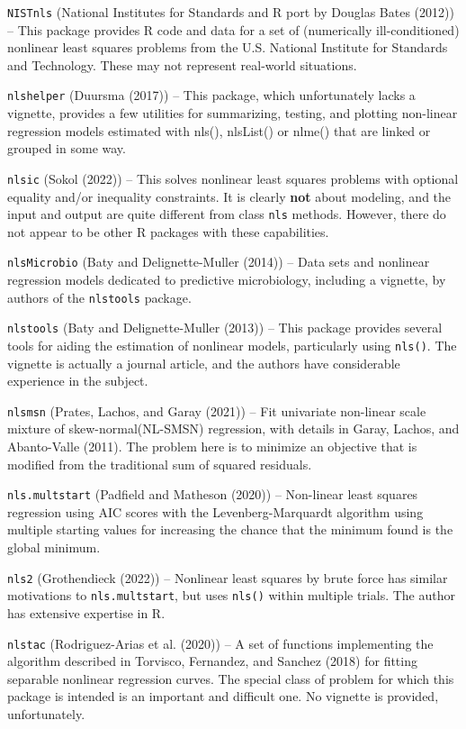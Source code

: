 \texttt{NISTnls} (National Institutes for Standards and R port by Douglas Bates (2012)) -- This package provides R code and data for a set of
(numerically ill-conditioned) nonlinear least squares problems from the U.S. National
Institute for Standards and Technology. These may not represent real-world situations.

\texttt{nlshelper} (Duursma (2017)) -- This package, which unfortunately lacks a
vignette, provides a few utilities for summarizing, testing, and plotting
non-linear regression models estimated with nls(), nlsList() or nlme() that
are linked or grouped in some way.

\texttt{nlsic} (Sokol (2022)) -- This solves nonlinear least squares problems with optional
equality and/or inequality constraints. It is clearly \textbf{not} about modeling, and
the input and output are quite different from class \texttt{nls} methods. However, there do
not appear to be other R packages with these capabilities.

\texttt{nlsMicrobio} (Baty and Delignette-Muller (2014)) -- Data sets and nonlinear regression models
dedicated to predictive microbiology, including a vignette, by authors of the
\texttt{nlstools} package.

\texttt{nlstools} (Baty and Delignette-Muller (2013)) -- This package provides several tools for aiding the estimation
of nonlinear models, particularly using \texttt{nls()}. The vignette is actually a journal
article, and the authors have considerable experience in the subject.

\texttt{nlsmsn} (Prates, Lachos, and Garay (2021)) -- Fit univariate non-linear scale mixture of skew-normal(NL-SMSN)
regression, with details in Garay, Lachos, and Abanto-Valle (2011). The problem
here is to minimize an objective that is modified from the traditional sum of squared
residuals.

\texttt{nls.multstart} (Padfield and Matheson (2020)) -- Non-linear least squares regression using
AIC scores with the Levenberg-Marquardt algorithm using multiple starting values
for increasing the chance that the minimum found is the global minimum.

\texttt{nls2} (Grothendieck (2022)) -- Nonlinear least squares by brute force has similar
motivations to \texttt{nls.multstart}, but uses \texttt{nls()} within multiple trials. The author
has extensive expertise in R.

\texttt{nlstac} (Rodriguez-Arias et al. (2020)) -- A set of functions implementing the algorithm described in
Torvisco, Fernandez, and Sanchez (2018) for fitting separable nonlinear regression curves. The
special class of problem for which this package is intended is an important and
difficult one. No vignette is provided, unfortunately.

